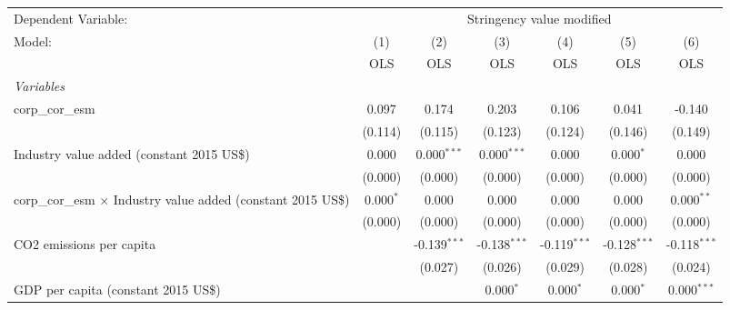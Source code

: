 
\begingroup
\centering
\begin{tabular}{lcccccc}
   \toprule
   Dependent Variable: & \multicolumn{6}{c}{Stringency value modified}\\
   Model:                                                                & (1)         & (2)            & (3)            & (4)            & (5)            & (6)\\  
                                                                         &  OLS        & OLS            & OLS            & OLS            & OLS            & OLS\\  
   \midrule
   \emph{Variables}\\
   corp\_cor\_esm                                                        & 0.097       & 0.174          & 0.203          & 0.106          & 0.041          & -0.140\\   
                                                                         & (0.114)     & (0.115)        & (0.123)        & (0.124)        & (0.146)        & (0.149)\\   
   Industry value added (constant 2015 US\$)                             & 0.000       & 0.000$^{***}$  & 0.000$^{***}$  & 0.000          & 0.000$^{*}$    & 0.000\\   
                                                                         & (0.000)     & (0.000)        & (0.000)        & (0.000)        & (0.000)        & (0.000)\\   
   corp\_cor\_esm $\times$ Industry value added (constant 2015 US\$)     & 0.000$^{*}$ & 0.000          & 0.000          & 0.000          & 0.000          & 0.000$^{**}$\\   
                                                                         & (0.000)     & (0.000)        & (0.000)        & (0.000)        & (0.000)        & (0.000)\\   
   CO2 emissions per capita                                              &             & -0.139$^{***}$ & -0.138$^{***}$ & -0.119$^{***}$ & -0.128$^{***}$ & -0.118$^{***}$\\   
                                                                         &             & (0.027)        & (0.026)        & (0.029)        & (0.028)        & (0.024)\\   
   GDP per capita (constant 2015 US\$)                                   &             &                & 0.000$^{*}$    & 0.000$^{*}$    & 0.000$^{*}$    & 0.000$^{***}$\\   

\end{tabular}
